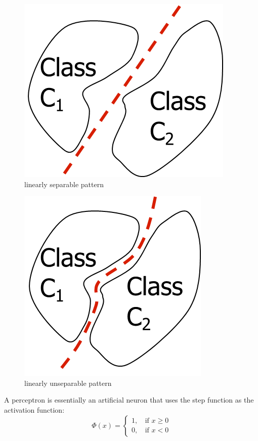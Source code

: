 \documentclass[a4paper,12pt,answers]{article}
\begin{document}
	\begin{multicols}{2}
		\begin{figure}[H]
			\centering
			\includegraphics[width=0.7\linewidth]{images/linear_sep}
			\caption{linearly separable pattern}
			\label{fig:linearsep}
		\end{figure}
		\begin{figure}[H]
			\centering
			\includegraphics[width=0.7\linewidth]{images/linear_unsep}
			\caption{linearly unseparable pattern}
			\label{fig:linearunsep}
		\end{figure}
		
	\end{multicols}
	\noindent
	A perceptron is essentially an artificial neuron that uses the step function as the activation function:
	\[
	\Phi(x) =
	\begin{cases}
		1, \, &\text{if } x \ge 0 \\
		0, \, &\text{if } x < 0
	\end{cases}
	\]
	
\end{document}
